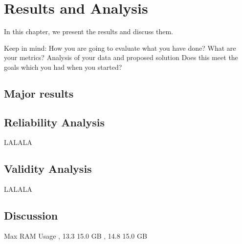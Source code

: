 \documentclass[a4paper,10pt,twocolumn]{article}
\numberwithin{figure}{section}
\numberwithin{table}{section}
\begin{document}
\newpage



\section{Results and Analysis}
In this chapter, we present the results and discuss them.

Keep in mind: How you are going to evaluate what you have done? What are your metrics?
Analysis of your data and proposed solution
Does this meet the goals which you had when you started?

\subsection{Major results}



\subsection{Reliability Analysis}
LALALA

\subsection{Validity Analysis}
LALALA


\subsection{Discussion}

Max RAM Usage , 13.3 15.0 GB , 14.8 15.0 GB 
       
\end{document}
